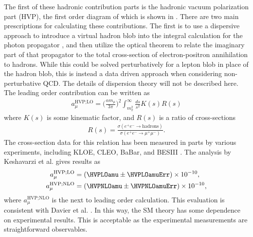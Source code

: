 The first of these hadronic contribution parts is the hadronic vacuum polarization part (HVP), the first order diagram of which is shown in . There are two main prescriptions for calculating these contributions. The first is to use a dispersive approach to introduce a virtual hadron blob into the integral calculation for the photon propagator \cite{Jeger}, and then utilize the optical theorem to relate the imaginary part of that propagator to the total cross-section of electron-positron annihilation to hadrons. While this could be solved perturbatively for a lepton blob in place of the hadron blob, this is instead a data driven approach when considering non-perturbative QCD. The details of dispersion theory will not be described here. The leading order contribution can be written as 
		\begin{align}
            a_{\mu}^{\text{HVP;LO}} = \Big(\frac{\alpha m_{\mu}}{3\pi}\Big)^{2} \int_{m_{\pi}^{2}}^{\infty} \frac{ds}{s^{2}} K(s) R(s)
		\end{align}
where $K(s)$ is some kinematic factor, and $R(s)$ is a ratio of cross-sections
		\begin{align}
            R(s) = \frac{\sigma(e^{+}e^{-} \rightarrow \text{hadrons})}{\sigma(e^{+}e^{-} \rightarrow \mu^{+}\mu^{-})}.
		\end{align}
The cross-section data for this relation has been measured in parts by various experiments, including KLOE, CLEO, BaBar, and BESIII \cite{KLOE,CLEO,BaBar,BESIII}. The analysis by Keshavarzi et al. \cite{Keshavarzi:2018mgv} gives results as 
		\begin{equation}
		\begin{aligned}
            a_{\mu}^{\text{HVP;LO}} &= (\HVPLOamu \pm \HVPLOamuErr) \times 10^{-10}, \\
            a_{\mu}^{\text{HVP;NLO}} &= (\HVPNLOamu \pm \HVPNLOamuErr) \times 10^{-10}, 
		\end{aligned}
		\end{equation}
where $a_{\mu}^{\text{HVP;NLO}}$ is the next to leading order calculation. This evaluation is consistent with Davier et al. \cite{HVP2}. In this way, the SM theory has some dependence on experimental results. This is acceptable as the experimental measurements are straightforward observables.


